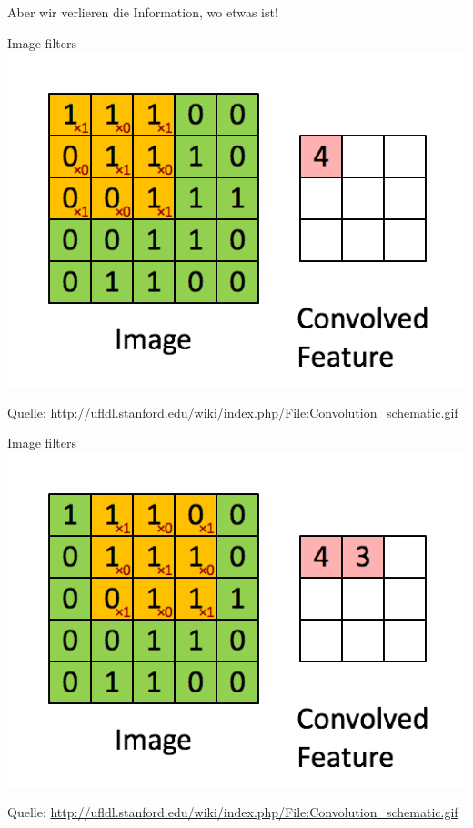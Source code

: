 \begin{frame}{}
    \begin{center}
        \Huge Aber wir verlieren die Information, wo etwas ist!

    \end{center}
\end{frame}

\begin{frame}{Image filters}
    \includegraphics[width=\textwidth, height=0.8\textheight, keepaspectratio]{../presentation-images/image-filter-0.png}

    Quelle: \href{http://ufldl.stanford.edu/wiki/index.php/File:Convolution_schematic.gif}{http://ufldl.stanford.edu/wiki/index.php/File:Convolution\_schematic.gif}
\end{frame}


\begin{frame}{Image filters}
    \includegraphics[width=\textwidth, height=0.8\textheight, keepaspectratio]{../presentation-images/image-filter-1.png}

    Quelle: \href{http://ufldl.stanford.edu/wiki/index.php/File:Convolution_schematic.gif}{http://ufldl.stanford.edu/wiki/index.php/File:Convolution\_schematic.gif}
\end{frame}

